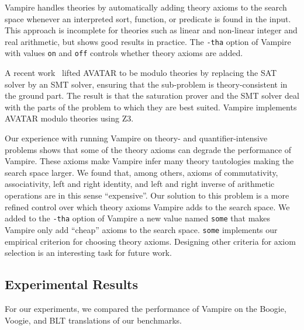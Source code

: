 Vampire handles theories by automatically adding theory axioms to the search space whenever an interpreted sort, function, or predicate is found in the input. This approach is incomplete for theories such as linear and non-linear integer and real arithmetic, but shows good results in practice. The \verb'-tha' option of Vampire with values \verb'on' and \verb'off' controls whether theory axioms are added.

A recent work~\cite{DBLP:conf/gcai/RegerB0V16} lifted AVATAR to be modulo theories by replacing the SAT solver by an SMT solver, ensuring that the sub-problem is theory-consistent in the ground part. The result is that the saturation prover and the SMT solver deal with the parts of the problem to which they are best suited. Vampire implements AVATAR modulo theories using Z3.

Our experience with running Vampire on theory- and quan\-ti\-fi\-er-in\-ten\-si\-ve problems shows that some of the theory axioms can degrade the performance of Vampire. These axioms make Vampire infer many theory tautologies making the search space larger. We found that, among others, axioms of commutativity, associativity, left and right identity, and left and right inverse of arithmetic operations are in this sense ``expensive''. Our solution to this problem is a more refined control over which theory axioms Vampire adds to the search space. We added to the \verb'-tha' option of Vampire a new value named \verb'some' that makes Vampire only add ``cheap'' axioms to the search space. \verb'some' implements our empirical criterion for choosing theory axioms. Designing other criteria for axiom selection is an interesting task for future work.


\subsection{Experimental Results}\label{sec:boogie/experiments/results}
For our experiments, we compared the performance of Vampire on the Boogie, Voogie, and BLT translations of our benchmarks. 

